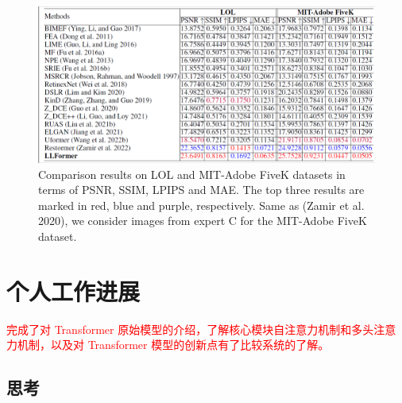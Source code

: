 \documentclass[letterpaper,10pt]{article}
\begin{document}
	\begin{figure}[htbp]
		\centering 
		\includegraphics[width=\columnwidth]{picture/Results_on_LOL_and_MIT-Adobe_FiveK}
		\captionsetup{font=scriptsize}
		\caption{
			\label{fig: result_in_LOL_and_MIT} %
			Comparison results on LOL and MIT-Adobe FiveK datasets in terms of PSNR, SSIM, LPIPS and MAE. The top three results are marked in red, blue and purple, respectively. Same as (Zamir et al. 2020), we consider images from expert C for the MIT-Adobe FiveK dataset.
		}
	\end{figure}
	
	\section{个人工作进展}
	
	\textcolor{red}{完成了对 Transformer 原始模型的介绍，了解核心模块自注意力机制和多头注意力机制，以及对 Transformer 模型的创新点有了比较系统的了解。}
	
	\subsection{思考}
	
\end{document}
